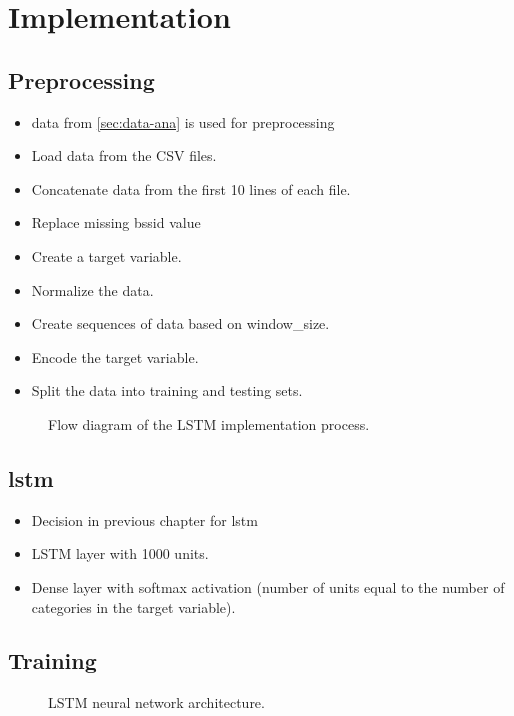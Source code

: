 \chapter{Implementation}

\section{Preprocessing}
\begin{itemize}
    \item data from \cref{sec:data-ana} is used for preprocessing
    \item Load data from the CSV files.
    \item Concatenate data from the first 10 lines of each file.
    \item Replace missing \acs{bssid} value
    \item Create a target variable.
    \item Normalize the data.
    \item Create sequences of data based on window_size.
    \item Encode the target variable.
    \item Split the data into training and testing sets.
\end{itemize}

\begin{figure}

\caption{Flow diagram of the LSTM implementation process.}
\label{fig:flow_diagram}
\end{figure} 


\section{\ac{lstm}}
\begin{itemize}
    \item Decision in previous chapter for \ac{lstm}
    \item LSTM layer with 1000 units.
    \item Dense layer with softmax activation (number of units equal to the number of categories in the target variable).
\end{itemize}

\section{Training}

\begin{figure}

\caption{LSTM neural network architecture.}
\label{fig:lstm_architecture}
\end{figure}
    
    
